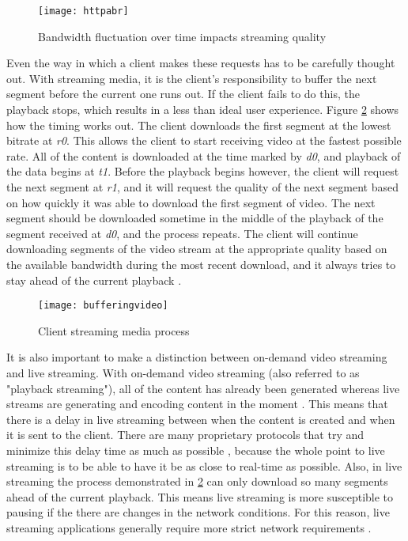 \documentclass[12pt]{article}
\begin{document}
\begin{figure}[htp]
  \begin{center}
    \texttt{[image: httpabr]}
    \caption{Bandwidth fluctuation over time impacts streaming quality}
    \label{fig:httpabr}
  \end{center}
\end{figure}


Even the way in which a client makes these requests has to be carefully thought out.  With streaming media, it is the client's responsibility to buffer the next segment before the current one runs out.  If the client fails to do this, the playback stops, which results in a less than ideal user experience.  Figure \ref{fig:bufferingvideo} shows how the timing works out.  The client downloads the first segment at the lowest bitrate at \textit{r0}.  This allows the client to start receiving video at the fastest possible rate.  All of the content is downloaded at the time marked by \textit{d0}, and playback of the data begins at \textit{t1}.  Before the playback begins however, the client will request the next segment at \textit{r1}, and it will request the quality of the next segment based on how quickly it was able to download the first segment of video.  The next segment should be downloaded sometime in the middle of the playback of the segment received at \textit{d0}, and the process repeats.  The client will continue downloading segments of the video stream at the appropriate quality based on the available bandwidth during the most recent download, and it always tries to stay ahead of the current playback \cite{Tanwir201674}.

\begin{figure}[htp]
  \begin{center}
    \texttt{[image: bufferingvideo]}
    \caption{Client streaming media process}
    \label{fig:bufferingvideo}
  \end{center}
\end{figure}

It is also important to make a distinction between on-demand video streaming and live streaming.  With on-demand video streaming (also referred to as "playback streaming"), all of the content has already been generated whereas live streams are generating and encoding content in the moment \cite{Kazantzidis02adaptivemultimedia}.  This means that there is a delay in live streaming between when the content is created and when it is sent to the client.  There are many proprietary protocols that try and minimize this delay time as much as possible \cite{Tanwir201674}, because the whole point to live streaming is to be able to have it be as close to real-time as possible.  Also, in live streaming the process demonstrated in \ref{fig:bufferingvideo} can only download so many segments ahead of the current playback.  This means live streaming is more susceptible to pausing if the there are changes in the network conditions.  For this reason, live streaming applications generally require more strict network requirements \cite{Kazantzidis02adaptivemultimedia}.
\end{document}
